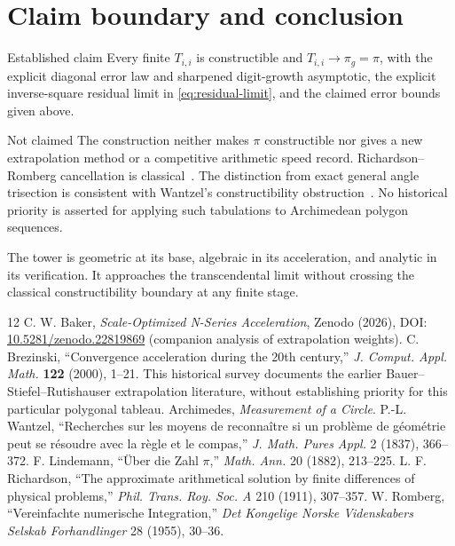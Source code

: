 \documentclass[11pt]{article}
\begin{document}
\section{Claim boundary and conclusion}
\begin{claimbox}{Established claim}
Every finite $T_{i,i}$ is constructible and $T_{i,i}\to\pi_g=\pi$, with the explicit diagonal error law and sharpened digit-growth asymptotic, the explicit inverse-square residual limit in \eqref{eq:residual-limit}, and the claimed error bounds given above.
\end{claimbox}
\begin{claimbox}{Not claimed}
The construction neither makes $\pi$ constructible nor gives a new extrapolation method or a competitive arithmetic speed record. Richardson--Romberg cancellation is classical~\cite{richardson,romberg,brezinski}. The distinction from exact general angle trisection is consistent with Wantzel's constructibility obstruction~\cite{wantzel}. No historical priority is asserted for applying such tabulations to Archimedean polygon sequences.
\end{claimbox}
The tower is geometric at its base, algebraic in its acceleration, and analytic in its verification. It approaches the transcendental limit without crossing the classical constructibility boundary at any finite stage.
\begin{thebibliography}{12}
 C. W. Baker, \emph{Scale-Optimized N-Series Acceleration}, Zenodo (2026), DOI: \href{https://doi.org/10.5281/zenodo.22819869}{10.5281/zenodo.22819869} (companion analysis of extrapolation weights).
 C. Brezinski, ``Convergence acceleration during the 20th century,'' \emph{J. Comput. Appl. Math.} \textbf{122} (2000), 1--21. This historical survey documents the earlier Bauer--Stiefel--Rutishauser extrapolation literature, without establishing priority for this particular polygonal tableau.
 Archimedes, \emph{Measurement of a Circle}.
 P.-L. Wantzel, ``Recherches sur les moyens de reconna\^itre si un probl\`eme de g\'eom\'etrie peut se r\'esoudre avec la r\`egle et le compas,'' \emph{J. Math. Pures Appl.} 2 (1837), 366--372.
 F. Lindemann, ``\"Uber die Zahl $\pi$,'' \emph{Math. Ann.} 20 (1882), 213--225.
 L. F. Richardson, ``The approximate arithmetical solution by finite differences of physical problems,'' \emph{Phil. Trans. Roy. Soc. A} 210 (1911), 307--357.
 W. Romberg, ``Vereinfachte numerische Integration,'' \emph{Det Kongelige Norske Videnskabers Selskab Forhandlinger} 28 (1955), 30--36.
\end{thebibliography}
\end{document}
